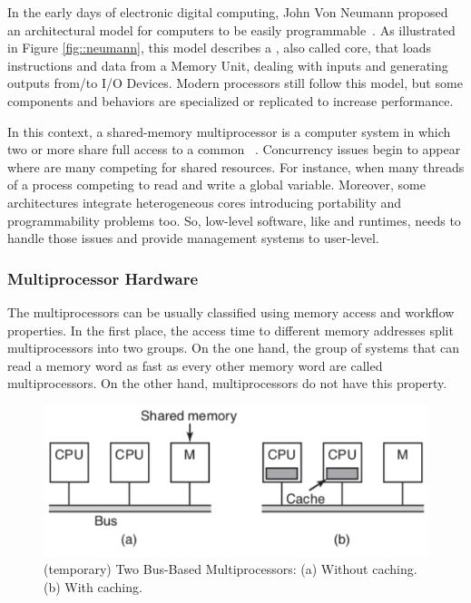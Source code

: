 		In the early days of electronic digital computing, John Von Neumann
		proposed an architectural model for computers to be easily programmable~\cite{von-neumann:model}.
		As illustrated in Figure \ref{fig::neumann}, this model describes a \cpu,
		also called core, that loads instructions and data from a Memory Unit,
		dealing with inputs and generating outputs from/to I/O Devices.
		Modern processors still follow this model, but some components and
		behaviors are specialized or replicated to increase performance.

		In this context, a shared-memory multiprocessor is a computer system
		in which two or more \cpus share full access to a common \ram~\cite{tanenbaum:4ed}.
		Concurrency issues begin to appear where are many \cpus competing for
		shared resources.
		For instance, when many threads of a process competing to read and write a global variable.
		Moreover, some architectures integrate heterogeneous cores introducing portability
		and programmability problems too.
		So, low-level software, like \oses and runtimes, needs to handle those
		issues and provide management systems to user-level.

		\subsubsection{Multiprocessor Hardware}
		\label{sec::multiprocessor_hw}

			The multiprocessors can be usually classified using memory access
			and workflow properties.
			In the first place, the access time to different memory addresses
			split multiprocessors into two groups.
			On the one hand, the group of systems that can read a memory word
			as fast as every other memory word are called \uma multiprocessors.
			On the other hand, \numa multiprocessors do not have this property.

			\begin{figure}[h]
				\centering
				\includegraphics[width=.9\textwidth]{images/uma.png}

				\caption{
					(temporary) Two Bus-Based \uma Multiprocessors: (a) Without caching. (b) With caching.
				}\par
				\label{fig::uma}
			\end{figure}


